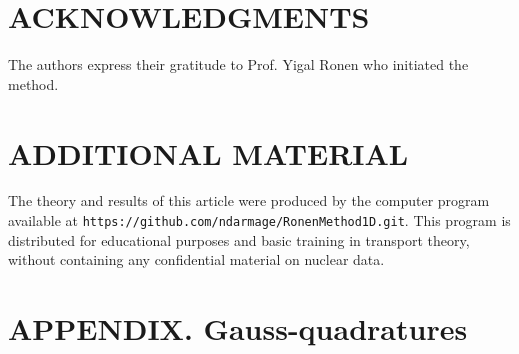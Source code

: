 \documentclass{ictt26}
\begin{document}
\section*{ACKNOWLEDGMENTS}

The authors express their gratitude to Prof. Yigal Ronen who initiated the method.

\section*{ADDITIONAL MATERIAL}

The theory and results of this article were produced by the computer program available at \texttt{https://github.com/ndarmage/RonenMethod1D.git}. This program is distributed for educational purposes and basic training in transport theory, without containing any confidential material on nuclear data.

\appendix
\section{APPENDIX. Gauss-quadratures}
\label{sec:apx_Flurig}
\end{document}
